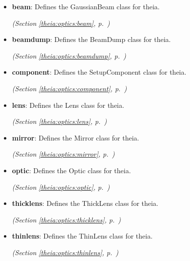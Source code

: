 \begin{itemize}
\setlength{\parskip}{0ex}
\item \textbf{beam}: Defines the GaussianBeam class for theia.



  \textit{(Section \ref{theia:optics:beam}, p.~\pageref{theia:optics:beam})}

\item \textbf{beamdump}: Defines the BeamDump class for theia.



  \textit{(Section \ref{theia:optics:beamdump}, p.~\pageref{theia:optics:beamdump})}

\item \textbf{component}: Defines the SetupComponent class for theia.



  \textit{(Section \ref{theia:optics:component}, p.~\pageref{theia:optics:component})}

\item \textbf{lens}: Defines the Lens class for theia.



  \textit{(Section \ref{theia:optics:lens}, p.~\pageref{theia:optics:lens})}

\item \textbf{mirror}: Defines the Mirror class for theia.



  \textit{(Section \ref{theia:optics:mirror}, p.~\pageref{theia:optics:mirror})}

\item \textbf{optic}: Defines the Optic class for theia.



  \textit{(Section \ref{theia:optics:optic}, p.~\pageref{theia:optics:optic})}

\item \textbf{thicklens}: Defines the ThickLens class for theia.



  \textit{(Section \ref{theia:optics:thicklens}, p.~\pageref{theia:optics:thicklens})}

\item \textbf{thinlens}: Defines the ThinLens class for theia.



  \textit{(Section \ref{theia:optics:thinlens}, p.~\pageref{theia:optics:thinlens})}

\end{itemize}

